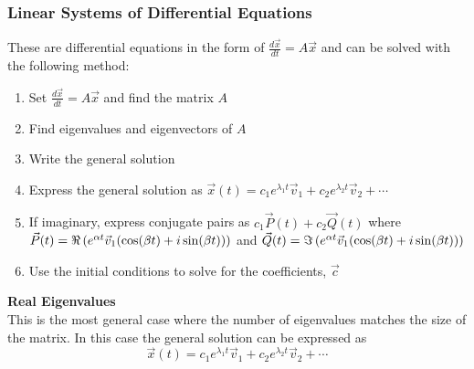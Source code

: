 \documentclass[11pt, fleqn]{article}
\begin{document}
\subsubsection{Linear Systems of Differential Equations}
These are differential equations in the form of $\frac{d\vec{x}}{dt}=A\vec{x}$ and can be solved with the following method:
\begin{enumerate}
    \item Set $\frac{d\vec{x}}{dt}=A\vec{x}$ and find the matrix $A$
    \item Find eigenvalues and eigenvectors of $A$
    \item Write the general solution
    \item Express the general solution as $\vec{x}(t)=c_1e^{\lambda_1t}\vec{v}_1+c_2e^{\lambda_2t}\vec{v}_2+\cdots$
    \item If imaginary, express conjugate pairs as $c_1\vec{P}(t)+c_2\vec{Q}(t)$ where $\vec{P}(t)=\Re\left( e^{\alpha t}\vec{v}_1(\cos(\beta t)+i\sin(\beta t)) \right)$ and $\vec{Q}(t)=\Im\left( e^{\alpha t}\vec{v}_1(\cos(\beta t)+i\sin(\beta t)) \right)$
    \item Use the initial conditions to solve for the coefficients, $\vec{c}$
\end{enumerate}
\textbf{Real Eigenvalues}\\
This is the most general case where the number of eigenvalues matches the size of the matrix. In this case the general solution can be expressed as
$$\vec{x}(t)=c_1e^{\lambda_1 t}\vec{v}_1+c_2e^{\lambda_2 t}\vec{v}_2+\cdots$$
\end{document}
